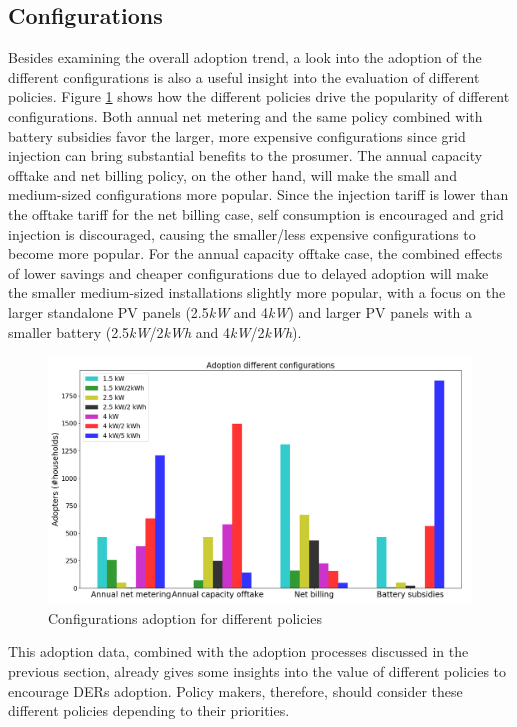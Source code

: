 \subsection{Configurations}
Besides examining the overall adoption trend, a look into the adoption of the different configurations is also a useful insight into the evaluation of different policies. Figure \ref{Figure:configpol} shows how the different policies drive the popularity of different configurations. Both annual net metering and the same policy combined with battery subsidies favor the larger, more expensive configurations since grid injection can bring substantial benefits to the prosumer. The annual capacity offtake and net billing policy, on the other hand, will make the small and medium-sized configurations more popular. Since the injection tariff is lower than the offtake tariff for the net billing case, self consumption is encouraged and grid injection is discouraged, causing the smaller/less expensive configurations to become more popular.  For the annual capacity offtake case, the combined effects of lower savings and cheaper configurations due to delayed adoption will make the smaller medium-sized installations slightly more popular, with a focus on the larger standalone PV panels (2.5\textit{kW} and 4\textit{kW}) and larger PV panels with a smaller battery (2.5\textit{kW}/2\textit{kWh} and 4\textit{kW}/2\textit{kWh}).  
\begin{figure}[h!]
\centering
\includegraphics[width=12cm]{Policies/Configurations.png}
\caption{Configurations adoption for different policies}
\label{Figure:configpol}
\end{figure}
\noindent
This adoption data, combined with the adoption processes discussed in the previous section, already gives some insights into the value of different policies to encourage DERs adoption. Policy makers, therefore, should consider these different policies depending to their priorities. 
